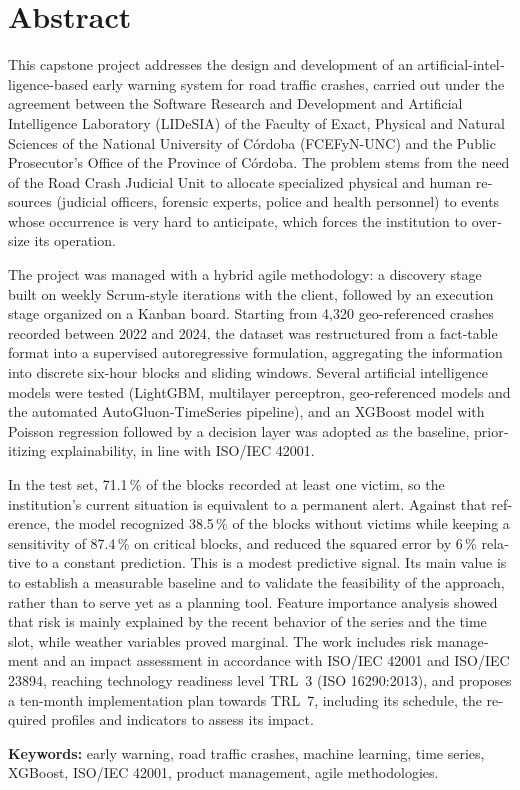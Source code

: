 \chapter*{Abstract}
\begin{otherlanguage}{english}

This capstone project addresses the design and development of an artificial-intelligence-based early warning system for road traffic crashes, carried out under the agreement between the Software Research and Development and Artificial Intelligence Laboratory (LIDeSIA) of the Faculty of Exact, Physical and Natural Sciences of the National University of Córdoba (FCEFyN-UNC) and the Public Prosecutor's Office of the Province of Córdoba. The problem stems from the need of the Road Crash Judicial Unit to allocate specialized physical and human resources (judicial officers, forensic experts, police and health personnel) to events whose occurrence is very hard to anticipate, which forces the institution to oversize its operation.

The project was managed with a hybrid agile methodology: a discovery stage built on weekly Scrum-style iterations with the client, followed by an execution stage organized on a Kanban board. Starting from 4,320 geo-referenced crashes recorded between 2022 and 2024, the dataset was restructured from a fact-table format into a supervised autoregressive formulation, aggregating the information into discrete six-hour blocks and sliding windows. Several artificial intelligence models were tested (LightGBM, multilayer perceptron, geo-referenced models and the automated AutoGluon-TimeSeries pipeline), and an XGBoost model with Poisson regression followed by a decision layer was adopted as the baseline, prioritizing explainability, in line with ISO/IEC 42001.

In the test set, 71.1\,\% of the blocks recorded at least one victim, so the institution's current situation is equivalent to a permanent alert. Against that reference, the model recognized 38.5\,\% of the blocks without victims while keeping a sensitivity of 87.4\,\% on critical blocks, and reduced the squared error by 6\,\% relative to a constant prediction. This is a modest predictive signal. Its main value is to establish a measurable baseline and to validate the feasibility of the approach, rather than to serve yet as a planning tool. Feature importance analysis showed that risk is mainly explained by the recent behavior of the series and the time slot, while weather variables proved marginal. The work includes risk management and an impact assessment in accordance with ISO/IEC 42001 and ISO/IEC 23894, reaching technology readiness level TRL~3 (ISO 16290:2013), and proposes a ten-month implementation plan towards TRL~7, including its schedule, the required profiles and indicators to assess its impact.

\medskip
\noindent\textbf{Keywords:} early warning, road traffic crashes, machine learning, time series, XGBoost, ISO/IEC 42001, product management, agile methodologies.

\end{otherlanguage}
